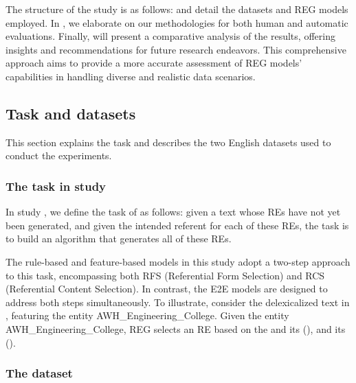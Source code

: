 The structure of the study is as follows:  and  detail the datasets and REG models employed. In , we elaborate on our methodologies for both human and automatic evaluations. Finally,  will present a comparative analysis of the results, offering insights and recommendations for future research endeavors. This comprehensive approach aims to provide a more accurate assessment of REG models’ capabilities in handling diverse and realistic data scenarios.


\subsection{Task and datasets} \label{sec:dataset}
This section explains the \context task and describes the two English datasets used to conduct the experiments.

\subsubsection{The \context task in study \studF}\label{sec:regtask}
In study \studF, we define the task of \context as follows: given a text whose REs have not yet been generated, and given the intended referent for each of these REs, the \context task is to build an algorithm that generates all of these REs.

The rule-based and feature-based models in this study adopt a two-step approach to this task, encompassing both RFS (Referential Form Selection) and RCS (Referential Content Selection). In contrast, the E2E models are designed to address both steps simultaneously. To illustrate, consider the delexicalized text in , featuring the entity AWH\_Engineering\_College. Given the entity AWH\_Engineering\_College, REG selects an RE based on the  and its  (), and its  ().



\subsubsection{The \webnlg dataset} \label{sec:webnlg}

